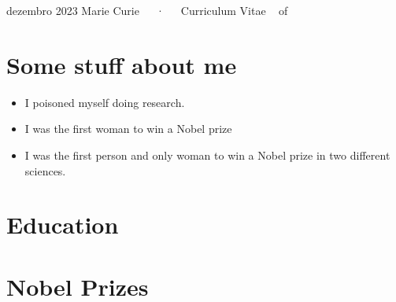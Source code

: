 \documentclass[11pt,a4paper,]{awesome-cv}
\providecommand{\tightlist}{%
	\setlength{\itemsep}{0pt}\setlength{\parskip}{0pt}}
\begin{document}
\makecvheader

\makecvfooter
  {dezembro 2023}
    {Marie Curie~~~·~~~Curriculum Vitae}
  {\thepage~ of \pageref{LastPage}~}





\hypertarget{some-stuff-about-me}{%
\section{Some stuff about me}\label{some-stuff-about-me}}

\begin{itemize}
\tightlist
\item
  I poisoned myself doing research.
\item
  I was the first woman to win a Nobel prize
\item
  I was the first person and only woman to win a Nobel prize in two
  different sciences.
\end{itemize}

\hypertarget{education}{%
\section{Education}\label{education}}

\begin{cventries}
    \vspace{-4.0mm}
    \vspace{-4.0mm}
    \vspace{-4.0mm}
\end{cventries}

\hypertarget{nobel-prizes}{%
\section{Nobel Prizes}\label{nobel-prizes}}
\end{document}
